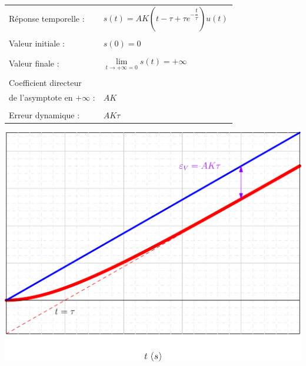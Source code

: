 \documentclass[10pt,fleqn]{article} %
\begin{document}
\noindent\begin{minipage}[c]{.4\linewidth}
\begin{center}
\begin{tabular}{ll}
Réponse temporelle : & 
$s(t)=AK\left( t-\tau+\tau e^{-\dfrac{t}{\tau}}
\right) u(t)$  \\
& \\
Valeur initiale : & $s(0)=0$ \\
& \\
Valeur finale : & $\lim\limits_{t\to +\infty = 0}s(t)=+\infty $\\
& \\
Coefficient directeur & \\
de l'asymptote en $+\infty $ :& $AK$\\
& \\
Erreur dynamique : & $AK\tau$\\
\end{tabular}
\end{center}
\end{minipage}\hfill
\begin{minipage}[c]{.48\linewidth}
\begin{center}
\includegraphics[width=\textwidth]{images/ordre1_rampe}
\end{center}
\end{minipage}
\end{document}
